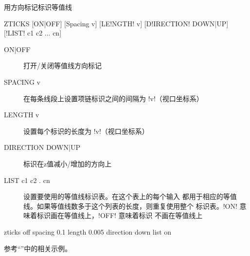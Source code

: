 \label{cmd:zticks}

用方向标记标识等值线

\begin{SACSTX}
ZTICKS [ON|OFF] [Spacing v] [LE!NGTH! v] [D!IRECTION! DOWN|UP] [!LIST! c1 c2 ... cn]
\end{SACSTX}

\begin{description}
\item [ON|OFF] 打开/关闭等值线方向标记
\item [SPACING v] 在每条线段上设置项链标识之间的间隔为 !v!（视口坐标系）
\item [LENGTH v] 设置每个标识的长度为 !v!（视口坐标系）
\item [DIRECTION DOWN|UP] 标识在z值减小/增加的方向上
\item [LIST c1 c2 . cn] 设置要使用的等值线标识表。在这个表上的每个输入
    都用于相应的等值线。如果等值线数多于这个列表的长度，则重复使用整个
    标识表。!ON! 意味着标识画在等值线上，!OFF! 意味着标识
    不画在等值线上
\end{description}

\begin{SACDFT}
zticks off spacing 0.1 length 0.005 direction down list on
\end{SACDFT}

参考``''中的相关示例。
